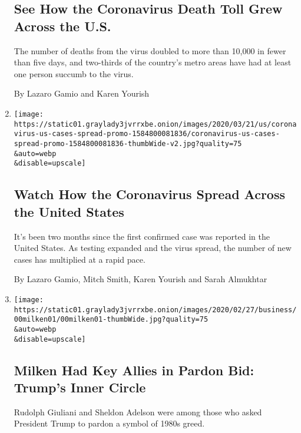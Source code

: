 \begin{enumerate}
  \hypertarget{see-how-the-coronavirus-death-toll-grew-across-the-us}{%
  \subsection{See How the Coronavirus Death Toll Grew Across the
  U.S.}\label{see-how-the-coronavirus-death-toll-grew-across-the-us}}

  The number of deaths from the virus doubled to more than 10,000 in
  fewer than five days, and two-thirds of the country's metro areas have
  had at least one person succumb to the virus.

  By Lazaro Gamio and Karen Yourish
\item
  \href{/interactive/2020/03/21/us/coronavirus-us-cases-spread.html}{}

  \texttt{[image: https://static01.graylady3jvrrxbe.onion/images/2020/03/21/us/coronavirus-us-cases-spread-promo-1584800081836/coronavirus-us-cases-spread-promo-1584800081836-thumbWide-v2.jpg?quality=75\\\&auto=webp\\\&disable=upscale]}

  \hypertarget{watch-how-the-coronavirus-spread-across-the-united-states}{%
  \subsection{Watch How the Coronavirus Spread Across the United
  States}\label{watch-how-the-coronavirus-spread-across-the-united-states}}

  It's been two months since the first confirmed case was reported in
  the United States. As testing expanded and the virus spread, the
  number of new cases has multiplied at a rapid pace.

  By Lazaro Gamio, Mitch Smith, Karen Yourish and Sarah Almukhtar
\item
  \href{/2020/03/01/business/michael-milken-trump-pardon.html}{}

  \texttt{[image: https://static01.graylady3jvrrxbe.onion/images/2020/02/27/business/00milken01/00milken01-thumbWide.jpg?quality=75\\\&auto=webp\\\&disable=upscale]}

  \hypertarget{milken-had-key-allies-in-pardon-bid-trumps-inner-circle}{%
  \subsection{Milken Had Key Allies in Pardon Bid: Trump's Inner
  Circle}\label{milken-had-key-allies-in-pardon-bid-trumps-inner-circle}}

  Rudolph Giuliani and Sheldon Adelson were among those who asked
  President Trump to pardon a symbol of 1980s greed.


\end{enumerate}
